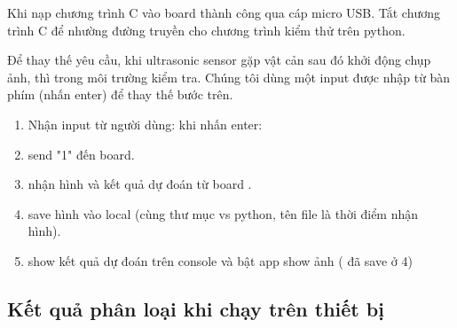 Khi nạp chương trình C vào board thành công qua cáp micro USB. Tắt chương trình C để nhường đường truyền cho chương trình kiểm thử trên python.

Để thay thế yêu cầu, khi ultrasonic sensor gặp vật cản sau đó khởi động chụp ảnh, thì trong môi trường kiểm tra. Chúng tôi dùng một input được nhập từ bàn phím (nhấn enter) để thay thế bước trên. 
\begin{enumerate}
    \item Nhận input từ người dùng: khi nhấn enter: 
    \item send "1" đến board.
    \item nhận hình và kết quả dự đoán từ board .
    \item save hình vào local (cùng thư mục vs python, tên file là thời điểm nhận hình).
    \item show kết quả dự đoán trên console và bật app show ảnh ( đã save ở 4)
\end{enumerate}

\subsection{Kết quả phân loại khi chạy trên thiết bị}

